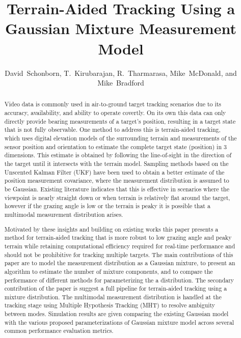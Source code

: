 \documentclass[journal]{IEEEtran}
\begin{document}
\title{Terrain-Aided Tracking Using a Gaussian Mixture Measurement Model}
\author{David~Schonborn, T.~Kirubarajan, R.~Tharmarasa, Mike~McDonald, and Mike~Bradford}
\maketitle







\begin{abstract}
Video data is commonly used in air-to-ground target tracking scenarios due to its accuracy, availability, and ability to operate covertly. On its own this data can only directly provide bearing measurements of a target's position, resulting in a target state that is not fully observable. One method to address this is terrain-aided tracking, which uses digital elevation models of the surrounding terrain and measurements of the sensor position and orientation to estimate the complete target state (position) in 3 dimensions. This estimate is obtained by following the line-of-sight in the direction of the target until it intersects with the terrain model. Sampling methods based on the Unscented Kalman Filter (UKF) have been used to obtain a better estimate of the position measurement covariance, where the measurement distribution is assumed to be Gaussian. Existing literature indicates that this is effective in scenarios where the viewpoint is nearly straight down or when terrain is relatively flat around the target, however if the grazing angle is low or the terrain is peaky it is possible that a multimodal measurement distribution arises.

Motivated by these insights and building on existing works this paper presents a method for terrain-aided tracking that is more robust to low grazing angle and peaky terrain while retaining computational efficiency required for real-time performance and should not be prohibitive for tracking multiple targets. The main contributions of this paper are to model the measurement distribution as a Gaussian mixture, to present an algorithm to estimate the number of mixture components, and to compare the performance of different methods for parameterizing the a distribution. The secondary contribution of the paper is suggest a full pipeline for terrain-aided tracking using a mixture distribution. The multimodal measurement distribution is handled at the tracking stage using Multiple Hypothesis Tracking (MHT) to resolve ambiguity between modes. Simulation results are given comparing the existing Gaussian model with the various proposed parameterizations of Gaussian mixture model across several common performance evaluation metrics.
\end{abstract}
\IEEEpeerreviewmaketitle
\end{document}
